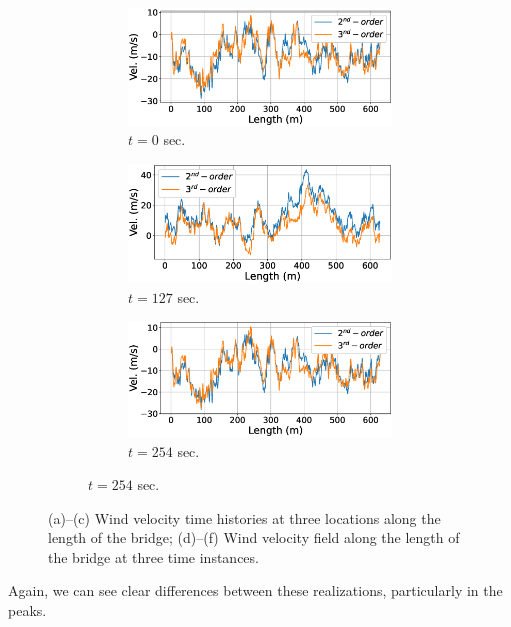 \documentclass[preprint, review, 12pt]{elsarticle}
\begin{document}
\begin{figure}[!ht]
    \begin{subfigure}{0.49\textwidth}
        \begin{subfigure}{\textwidth}
        \includegraphics[width=1.0\linewidth]{plots/samples_0s.eps}
        \caption{$t=0$ sec.}
        \end{subfigure}
        \begin{subfigure}{\textwidth}
        \includegraphics[width=1.0\linewidth]{plots/samples_128s.eps}
        \caption{$t=127$ sec.}
        \end{subfigure}
        \begin{subfigure}{\textwidth}
        \includegraphics[width=1.0\linewidth]{plots/samples_256s.eps}
        \caption{$t=254$ sec.}
        \end{subfigure}
    \end{subfigure}
    \caption{(a)--(c) Wind velocity time histories at three locations along the length of the bridge; (d)--(f) Wind velocity field along the length of the bridge at three time instances.}
    \label{fig:slice_along_time_and_length}
\end{figure}
Again, we can see clear differences between these realizations, particularly in the peaks.
\end{document}
